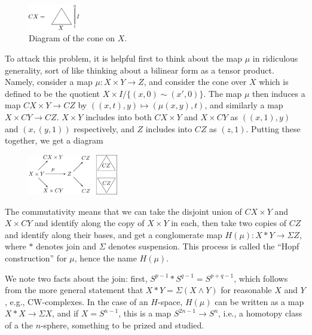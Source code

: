 \documentclass{article}
\newcommand{\sprod}{\wedge}
\newcommand{\Suspend}{\Sigma}
\begin{document}
\begin{figure}
\centering\includegraphics[width=0.2\textwidth]{figures/fig3.pdf}
\caption{\small Diagram of the cone on $X$.}
\end{figure}
To attack this problem, it is helpful first to think about the map $\mu$ in ridiculous generality, sort of like thinking about a bilinear form as a tensor product.  Namely, consider a map $\mu: X \times Y \to Z$, and consider the cone over $X$ which is defined to be the quotient $X \times I /\{(x, 0) \sim (x', 0)\}$.  The map $\mu$ then induces a map $CX \times Y \to CZ$ by $((x, t), y) \mapsto (\mu(x, y), t)$, and similarly a map $X \times CY \to CZ$.  $X \times Y$ includes into both $CX \times Y$ and $X \times CY$ as $((x, 1), y)$ and $(x, (y, 1))$ respectively, and $Z$ includes into $CZ$ as $(z, 1)$.  Putting these together, we get a diagram
\begin{figure}[h!]
\centering\includegraphics[width=0.35\textwidth]{figures/fig4.pdf} %
\end{figure}

The commutativity means that we can take the disjoint union of $CX \times Y$ and $X \times CY$ and identify along the copy of $X \times Y$ in each, then take two copies of $CZ$ and identify along their bases, and get a conglomerate map $H(\mu): X \ast Y \to \Suspend Z$, where $\ast$ denotes join and $\Suspend$ denotes suspension.  This process is called the ``Hopf construction'' for $\mu$, hence the name $H(\mu)$.

We note two facts about the join: first, $S^{p-1} \ast S^{q-1} = S^{p + q - 1}$, which follows from the more general statement that $X \ast Y = \Suspend(X \sprod Y)$ for reasonable $X$ and $Y$, e.g., CW-complexes.  In the case of an $H$-space, $H(\mu)$ can be written as a map $X \ast X \to \Suspend X$, and if $X = S^{n-1}$, this is a map $S^{2n-1} \to S^n$, i.e., a homotopy class of a the $n$-sphere, something to be prized and studied. %
\end{document}
